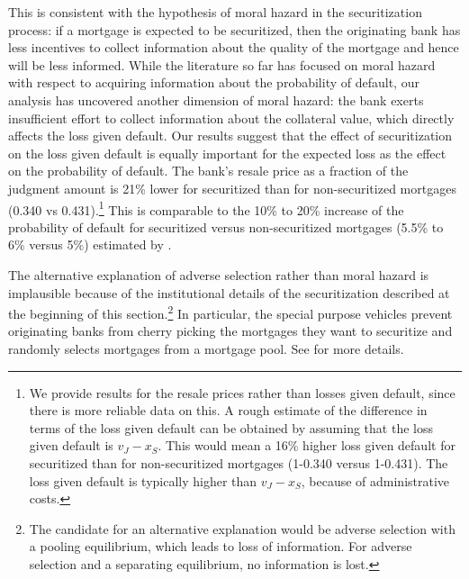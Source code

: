 \documentclass[11pt,twopage]{article}
\begin{document}
This is consistent with the hypothesis of moral hazard in the
securitization process: if a mortgage is expected to be securitized,
then the originating bank has less incentives to collect information
about the quality of the mortgage and hence will be less informed. While the literature so far has focused
on moral hazard with respect to acquiring information about the
probability of default, our analysis has uncovered another dimension of moral hazard: the bank exerts insufficient effort
to collect information about the collateral value, which directly affects the loss given default. Our results
suggest that the effect of securitization on the loss given default is
equally important for the expected loss as the effect on the
probability of default. The bank's resale price as a fraction of the
judgment amount is 21\% lower for securitized than for non-securitized
mortgages (0.340 vs 0.431).\footnote{We provide results for the resale
  prices rather than losses given default, since there is more
  reliable data on this. A rough estimate of the difference in terms
  of the loss given default can be obtained by assuming that the loss
  given default is $v_J-x_S$. This would mean a 16\% higher loss given
  default for securitized than for non-securitized mortgages (1-0.340
  versus 1-0.431). The loss given default is typically higher than
  $v_J-x_S$, because of administrative costs.} This is comparable to
the 10\% to 20\% increase of the probability of default for
securitized versus non-securitized mortgages (5.5\% to 6\% versus 5\%)
estimated by \cite{keys2008did}.

The alternative explanation of adverse selection rather than moral
hazard is implausible because of the institutional details of the
securitization described at the beginning of this
section.\footnote{The candidate for an alternative explanation would
  be adverse selection with a pooling equilibrium, which leads to loss
  of information. For adverse selection and a separating equilibrium,
  no information is lost.} In particular, the special purpose vehicles
prevent originating banks from cherry picking the mortgages they want
to securitize and randomly selects mortgages from a mortgage pool. See
\cite{keys2008did} for more details.

\end{document}
